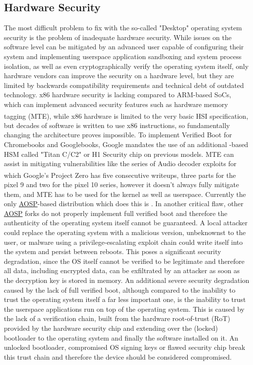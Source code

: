 \documentclass[a4paper,12pt]{report}
\begin{document}
\subsection{Hardware Security}
The most difficult problem to fix with the so-called "Desktop" operating system security is the problem of inadequate hardware security. While issues on the software level can be mitigated by an advanced user capable of configuring their system and implementing userspace application sandboxing and system process isolation, as well as even cryptographically verify the operating system itself, only hardware vendors can improve the security on a hardware level, but they are limited by backwards compatibility requirements and technical debt of outdated technology. 
x86 hardware security is lacking compared to ARM-based SoCs, which can implement advanced security features such as hardware memory tagging (MTE), while x86 hardware is limited to the very basic HSI \textsuperscript{\citep{hsi}} specification, but decades of software is written to use x86 instructions, so fundamentally changing the architecture proves impossible. To implement Verified Boot for Chromebooks and Googlebooks, Google mandates the use of an additional \citeauthor{opentitan}-based HSM called "Titan C/C2" or H1 Security chip on previous models.
MTE can assist in mitigating vulnerabilities like the series of Audio decoder exploits for which Google's Project Zero has five consecutive writeups\textsuperscript{\citep{pixel9part1,pixel9part2,pixel9part3,soundbarrier2,pixel10exploit}}, three parts for the pixel 9 and two for the pixel 10 series, however it doesn't always fully mitigate them, and MTE has to be used for the kernel as well as userspace. Currently the only \hyperref[aosp]{AOSP}-based distribution which does this is \citeauthor{grapheneos}. In another critical flaw, other \hyperref[aosp]{AOSP} forks do not properly implement full verified boot and therefore the authenticity of the operating system itself cannot be guaranteed. A local attacker could replace the operating system with a malicious version, unbeknownst to the user, or malware using a privilege-escalating exploit chain could write itself into the system and persist between reboots. This poses a significant security degradation, since the OS itself cannot be verified to be legitimate and therefore all data, including encrypted data, can be exfiltrated by an attacker as soon as the decryption key is stored in memory. An additional severe security degradation caused by the lack of full verified boot, although compared to the inability to trust the operating system itself a far less important one, is the inability to trust the userspace applications run on top of the operating system. This is caused by the lack of a verification chain, built from the hardware root-of-trust (RoT) provided by the hardware security chip and extending over the (locked) bootloader to the operating system and finally the software installed on it. An unlocked bootloader, compromised OS signing keys or flawed security chip break this trust chain and therefore the device should be considered compromised.
\end{document}
